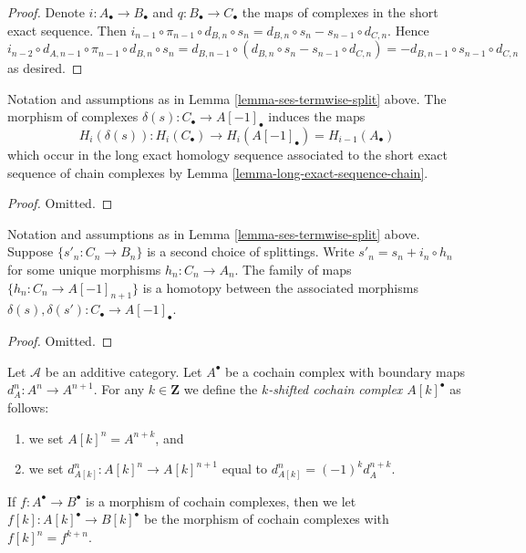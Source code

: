 \begin{proof}
Denote $i : A_\bullet \to B_\bullet$ and $q : B_\bullet \to C_\bullet$
the maps of complexes in the short exact sequence. Then
$i_{n - 1} \circ \pi_{n - 1} \circ d_{B, n} \circ s_n =
d_{B, n} \circ s_n - s_{n - 1} \circ d_{C, n}$. Hence
$i_{n - 2} \circ d_{A, n - 1} \circ \pi_{n - 1} \circ d_{B, n} \circ s_n =
d_{B, n - 1} \circ (d_{B, n} \circ s_n - s_{n - 1} \circ d_{C, n}) =
- d_{B, n - 1} \circ s_{n - 1} \circ d_{C, n}$ as desired.
\end{proof}

\begin{lemma}
\label{lemma-ses-termwise-split-long}
Notation and assumptions as in Lemma \ref{lemma-ses-termwise-split} above.
The morphism of complexes $\delta(s) : C_\bullet \to A[-1]_\bullet$
induces the maps
$$
H_i(\delta(s)) :
H_i(C_\bullet) \longrightarrow H_i(A[-1]_\bullet) = H_{i - 1}(A_\bullet)
$$
which occur in the long exact homology sequence associated
to the short exact sequence of chain complexes by
Lemma \ref{lemma-long-exact-sequence-chain}.
\end{lemma}

\begin{proof}
Omitted.
\end{proof}

\begin{lemma}
\label{lemma-ses-termwise-split-homotopy}
Notation and assumptions as in Lemma \ref{lemma-ses-termwise-split} above.
Suppose $\{s'_n : C_n \to B_n\}$ is a second choice of splittings.
Write $s'_n = s_n + i_n \circ h_n$ for some unique
morphisms $h_n : C_n \to A_n$. The family of maps
$\{h_n : C_n \to A[-1]_{n + 1}\}$ is a homotopy between
the associated morphisms
$\delta(s), \delta(s') : C_\bullet \to A[-1]_\bullet$.
\end{lemma}

\begin{proof}
Omitted.
\end{proof}

\begin{definition}
\label{definition-shift-cochain}
Let $\mathcal{A}$ be an additive category.
Let $A^\bullet$ be a cochain complex
with boundary maps $d_A^n : A^n \to A^{n + 1}$.
For any $k \in \mathbf{Z}$ we define the
{\it $k$-shifted cochain complex $A[k]^\bullet$}
as follows:
\begin{enumerate}
\item we set $A[k]^n = A^{n + k}$, and
\item we set $d_{A[k]}^n : A[k]^n \to A[k]^{n + 1}$
equal to $d_{A[k]}^n = (-1)^k d_A^{n + k}$.
\end{enumerate}
If $f : A^\bullet \to B^\bullet$ is a morphism of
cochain complexes, then we let
$f[k] : A[k]^\bullet \to B[k]^\bullet$ be the
morphism of cochain complexes with
$f[k]^n = f^{k + n}$.
\end{definition}

